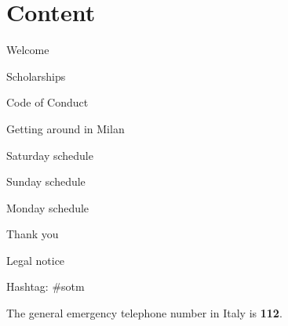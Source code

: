 \section*{Content}

\vspace*{0.35em}%
\noindent Welcome\dotfill \pageref{welcome}

\vspace*{0.35em}%
\noindent Scholarships \dotfill \pageref{scholarships}

\vspace*{0.35em}%
\noindent Code of Conduct \dotfill \pageref{coc}

\vspace*{0.35em}%
\noindent Getting around in Milan\dotfill \pageref{getting-around}

\vspace*{0.35em}%
\noindent Saturday schedule\dotfill \pageref{saturday}

\vspace*{0.35em}%
\noindent Sunday schedule \dotfill \pageref{sunday}

\vspace*{0.35em}%
\noindent Monday schedule \dotfill \pageref{monday}

\vspace*{0.35em}%
\noindent Thank you \dotfill \pageref{thanks}

\vspace*{0.35em}%
\noindent Legal notice \dotfill \pageref{legal}

\vfill
\noindent
Hashtag: \#sotm

\vspace*{0.8em}%
\noindent
The general emergency telephone number in Italy is \textbf{112}.
\vfill

\newpage
